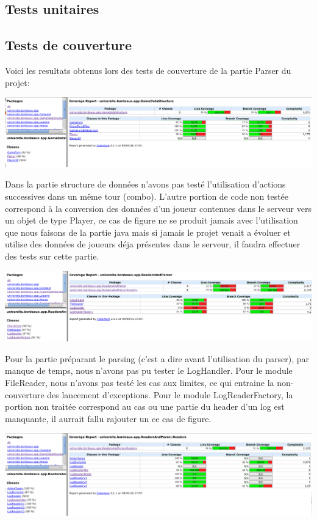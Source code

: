 \subsection{Tests unitaires}



\subsection{Tests de couverture}
Voici les resultats obtenus lors des tests de couverture de la partie Parser du projet:

\includegraphics[scale=0.35,keepaspectratio]{./coverage_GameDataStructure}

Dans la partie structure de données n'avons pas testé l'utilisation d'actions successives dans un même tour (combo). L'autre portion de code non testée correspond à la conversion des données d'un joueur contenues dans le serveur vers un objet de type Player, ce cas de figure ne se produit jamais avec l'utilisation que nous faisons de la partie java mais si jamais le projet venait a évoluer et utilise des données de joueurs déja présentes dans le serveur, il faudra effectuer des tests sur cette partie.

\includegraphics[scale=0.35,keepaspectratio]{./coverage_ReadersAndParser}

Pour la partie préparant le parsing (c'est a dire avant l'utilisation du parser), par manque de temps, nous n'avons pas pu tester le LogHandler. Pour le module FileReader, nous n'avons pas testé les cas aux limites, ce qui entraine la non-couverture des lancement d'exceptions. Pour le module LogReaderFactory, la portion non traitée correspond au cas ou une partie du header d'un log est manquante, il aurrait fallu rajouter un ce cas de figure.

\includegraphics[scale=0.35,keepaspectratio]{./coverage_ReadersLog}

